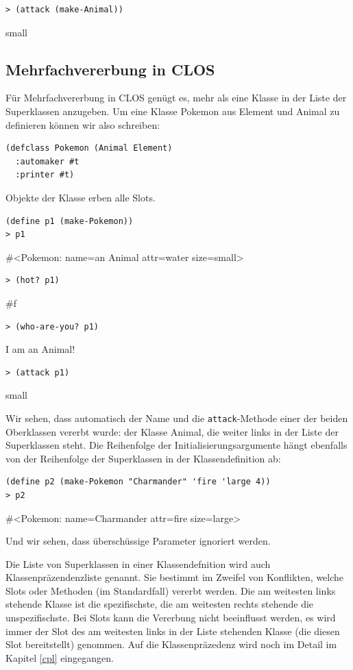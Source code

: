 \begin{lstlisting}
> (attack (make-Animal))
\end{lstlisting}
{\rsymbol small}

\subsection{Mehrfachvererbung in CLOS}
Für Mehrfachvererbung in CLOS genügt es, mehr als eine Klasse in der Liste der Superklassen anzugeben. Um eine Klasse Pokemon aus Element und Animal zu definieren können wir also schreiben:

\begin{lstlisting}
(defclass Pokemon (Animal Element)
  :automaker #t
  :printer #t)
\end{lstlisting}

Objekte der Klasse erben alle Slots.

\begin{lstlisting}
(define p1 (make-Pokemon))
> p1
\end{lstlisting}
{\routput \#<Pokemon: name={\qq}an Animal{\qq} attr=water size=small>}

\begin{lstlisting}
> (hot? p1)
\end{lstlisting}
{\routput \#f}

\begin{lstlisting}
> (who-are-you? p1)
\end{lstlisting}
{\routput {\qq}I am an Animal!\qq}

\begin{lstlisting}
> (attack p1)
\end{lstlisting}
{\rsymbol small}

Wir sehen, dass automatisch der Name und die \texttt{attack}-Methode einer der beiden Oberklassen vererbt wurde: der Klasse Animal, die weiter links in der Liste der Superklassen steht. Die Reihenfolge der Initialisierungsargumente hängt ebenfalls von der Reihenfolge der Superklassen in der Klassendefinition ab:

\begin{lstlisting}
(define p2 (make-Pokemon "Charmander" 'fire 'large 4))
> p2
\end{lstlisting}
{\routput \#<Pokemon: name={\qq}Charmander{\qq} attr=fire size=large>}

Und wir sehen, dass überschüssige Parameter ignoriert werden.

Die Liste von Superklassen in einer Klassendefnition wird auch Klassenpräzendenzliste genannt. Sie bestimmt im Zweifel von Konflikten, welche Slots oder Methoden (im Standardfall) vererbt werden. Die am weitesten links stehende Klasse ist die spezifischste, die am weitesten rechts stehende die unspezifischste. Bei Slots kann die Vererbung nicht beeinflusst werden, es wird immer der Slot des am weitesten links in der Liste stehenden Klasse (die diesen Slot bereitstellt) genommen. Auf die Klassenpräzedenz wird noch im Detail im Kapitel \ref{cpl} eingegangen.

